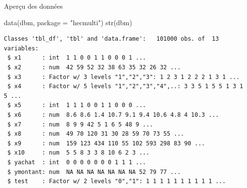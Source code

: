 \documentclass[
  ignorenonframetext,
]{beamer}
\newenvironment{Shaded}{\begin{snugshade}}{\end{snugshade}}
\newcommand{\AttributeTok}[1]{\textcolor[rgb]{0.40,0.45,0.13}{#1}}
\newcommand{\FunctionTok}[1]{\textcolor[rgb]{0.28,0.35,0.67}{#1}}
\newcommand{\NormalTok}[1]{\textcolor[rgb]{0.00,0.23,0.31}{#1}}
\newcommand{\StringTok}[1]{\textcolor[rgb]{0.13,0.47,0.30}{#1}}
\begin{document}
\begin{frame}[fragile]{Aperçu des données}
\protect{}\label{aperuxe7u-des-donnuxe9es}
\footnotesize

\begin{Shaded}
\begin{Highlighting}[numbers=left,,]
\FunctionTok{data}\NormalTok{(dbm, }\AttributeTok{package =} \StringTok{"hecmulti"}\NormalTok{)}
\FunctionTok{str}\NormalTok{(dbm)}
\end{Highlighting}
\end{Shaded}

\begin{verbatim}
Classes 'tbl_df', 'tbl' and 'data.frame':   101000 obs. of  13 variables:
 $ x1      : int  1 1 0 0 1 1 0 0 0 1 ...
 $ x2      : num  42 59 52 32 38 63 35 32 26 32 ...
 $ x3      : Factor w/ 3 levels "1","2","3": 1 2 3 1 2 2 2 1 3 1 ...
 $ x4      : Factor w/ 5 levels "1","2","3","4",..: 3 3 5 1 5 5 1 3 1 5 ...
 $ x5      : int  1 1 1 0 0 1 1 0 0 0 ...
 $ x6      : num  8.6 8.6 1.4 10.7 9.1 9.4 10.6 4.8 4 10.3 ...
 $ x7      : num  8 9 9 42 5 1 6 5 48 9 ...
 $ x8      : num  49 70 120 31 30 28 59 70 73 55 ...
 $ x9      : num  159 123 434 110 55 102 593 298 83 90 ...
 $ x10     : num  5 5 8 3 3 8 10 6 2 3 ...
 $ yachat  : int  0 0 0 0 0 0 0 1 1 1 ...
 $ ymontant: num  NA NA NA NA NA NA NA 52 79 77 ...
 $ test    : Factor w/ 2 levels "0","1": 1 1 1 1 1 1 1 1 1 1 ...
\end{verbatim}

\normalsize
\end{frame}
\end{document}
